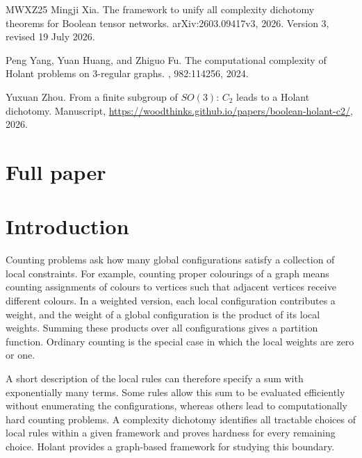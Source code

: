 \documentclass[11pt,letterpaper,onecolumn]{article}
\theoremstyle{plain}
\theoremstyle{definition}
\theoremstyle{remark}
\begin{document}
\begin{thebibliography}{MWXZ25}
Mingji Xia.
\newblock The framework to unify all complexity dichotomy theorems for
  {Boolean} tensor networks.
\newblock arXiv:2603.09417v3, 2026.
\newblock Version 3, revised 19 July 2026.

Peng Yang, Yuan Huang, and Zhiguo Fu.
\newblock The computational complexity of {Holant} problems on 3-regular
  graphs.
, 982:114256, 2024.

Yuxuan Zhou.
\newblock From a finite subgroup of {$SO(3)$}: {$C_2$} leads to a {Holant}
  dichotomy.
\newblock Manuscript,
  \url{https://woodthinks.github.io/papers/boolean-holant-c2/}, 2026.

\end{thebibliography}

\clearpage
\setcounter{section}{0}
\setcounter{equation}{0}
\setcounter{figure}{0}
\setcounter{table}{0}
\setcounter{footnote}{0}
\setcounter{page}{1}
\renewcommand{\thepage}{F-\arabic{page}}
\renewcommand{\thesection}{F.\arabic{section}}
\renewcommand{\theHsection}{full.\arabic{section}}
\renewcommand{\theequation}{F.\arabic{equation}}
\renewcommand{\theHequation}{full.\arabic{equation}}
\renewcommand{\thefigure}{F.\arabic{figure}}
\renewcommand{\theHfigure}{full.\arabic{figure}}
\renewcommand{\thetable}{F.\arabic{table}}
\renewcommand{\theHtable}{full.\arabic{table}}
\section*{Full paper}
\section{Introduction}
\label{sec:introduction}

Counting problems ask how many global configurations satisfy a collection
of local constraints.  For example, counting proper colourings of a graph
means counting assignments of colours to vertices such that adjacent
vertices receive different colours.  In a weighted version, each local
configuration contributes a weight, and the weight of a global
configuration is the product of its local weights.  Summing these products
over all configurations gives a partition function.  Ordinary counting
is the special case in which the local weights are zero or one.

A short description of the local rules can therefore specify a sum with
exponentially many terms.  Some rules allow this sum to be evaluated
efficiently without enumerating the configurations, whereas others lead
to computationally hard counting problems. A complexity dichotomy
identifies all tractable choices of local rules within a given framework
and proves hardness for every remaining choice. Holant provides a
graph-based framework for studying this boundary.
\end{document}
